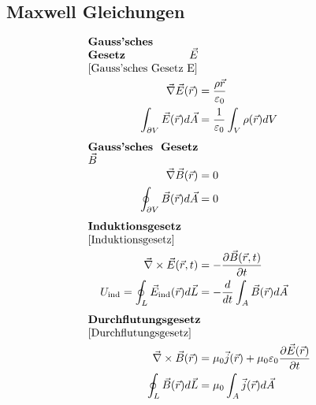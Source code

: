 \subsection{Maxwell Gleichungen}
    \begin{align*}
        \parbox{3.5cm}{\textbf{Gauss'sches Gesetz $\vec{E}$} \ref{Gauss'sches Gesetz E}}\\
        \vec{\nabla}\vec{E}(\vec{r}) &= \frac{\rho{\vec{r}}}{\varepsilon_0}\\
        \int_{\partial V} \vec{E}(\vec{r}) d \vec{A} &= \frac{1}{\varepsilon_0} \int_V \rho(\vec{r}) dV
        \\[0.5em]
        \parbox{3.5cm}{\textbf{Gauss'sches Gesetz $\vec{B}$}}\\
        \vec{\nabla}\vec{B}(\vec{r}) &= 0\\
        \oint_{\partial V} \vec{B}(\vec{r}) d \vec{A} &= 0
        \\[0.5em]
        \parbox{3.5cm}{\textbf{Induktionsgesetz} \ref{Induktionsgesetz}}\\
        \vec{\nabla} \times \vec{E}(\vec{r},t) &= - \frac{\partial \vec{B}(\vec{r},t)}{\partial t}\\
        U_\text{ind} = \oint_L \vec{E}_\text{ind}(\vec{r}) d \vec{L} &= - \frac{d}{dt} \int_A \vec{B}(\vec{r}) d \vec{A}
        \\[0.5em]
        \parbox{3.5cm}{\textbf{Durchflutungsgesetz} \ref{Durchflutungsgesetz}}\\
        \vec{\nabla} \times \vec{B}(\vec{r}) &= \mu_0 \vec{j}(\vec{r}) + \mu_0 \varepsilon_0 \frac{\partial \vec{E}(\vec{r})}{\partial t}\\
        \oint_L \vec{B}(\vec{r}) d \vec{L} &= \mu_0 \int_A \vec{j}(\vec{r}) d \vec{A}
    \end{align*}